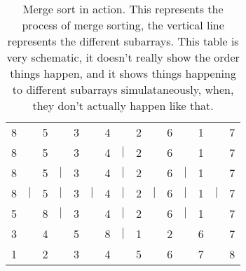 \documentclass[11pt,a4paper]{scrartcl}
\begin{document}
\begin{table}
\begin{tabular}{ccccccccccccccc}
8&&5&&3&&4&&2&&6&&1&&7\\
8&&5&&3&&4&$|$&2&&6&&1&&7\\
8&&5&$|$&3&&4&$|$&2&&6&$|$&1&&7\\
8&$|$&5&$|$&3&$|$&4&$|$&2&$|$&6&$|$&1&$|$&7\\
5&&8&$|$&3&&4&$|$&2&&6&$|$&1&&7\\
3&&4&&5&&8&$|$&1&&2&&6&&7\\
1&&2&&3&&4&&5&&6&&7&&8
\end{tabular}
\caption{Merge sort in action. This represents the process of merge
  sorting, the vertical line represents the different subarrays. This
  table is very schematic, it doesn't really show the order things
  happen, and it shows things happening to different subarrays
  simulataneously, when, they don't actually happen like
  that.\label{table_merge_sort}}
\end{table}
\end{document}
